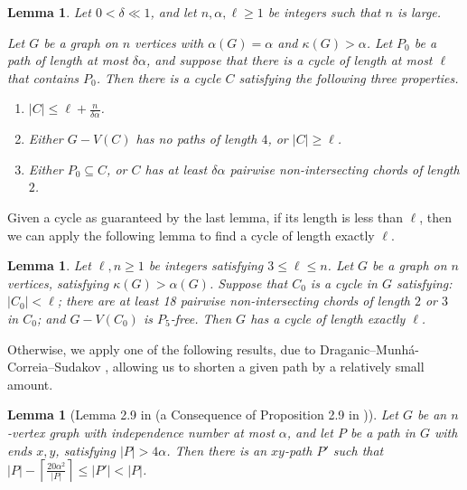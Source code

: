 \documentclass[11pt,english]{article}
\theoremstyle{plain}
\newtheorem{lemma}[theorem]{Lemma}
\theoremstyle{definition}
\theoremstyle{remark}
\newcommand{\ceil}[1]{
	\left\lceil #1 \right\rceil
}
\begin{document}
		\begin{lemma} \label{lem:long}
			Let $0 < \delta \ll 1$, and let $n, \alpha, \ell \ge 1$ be integers such that $n$ is large.

			Let $G$ be a graph on $n$ vertices with $\alpha(G) = \alpha$ and $\kappa(G) > \alpha$.
			Let $P_0$ be a path of length at most $\delta \alpha$, and suppose that there is a cycle of length at most $\ell$ that contains $P_0$.
			Then there is a cycle $C$ satisfying the following three properties.
			\begin{enumerate}[label = \rm(\arabic*)]
				\item \label{itm:long-jump}
					$|C| \le \ell + \frac{n}{\delta \alpha}$.
				\item \label{itm:long-length-4}
					Either $G - V(C)$ has no paths of length $4$, or $|C| \ge \ell$. 
				\item \label{itm:long-chords}
					Either $P_0 \subseteq C$, or $C$ has at least $\delta \alpha$ pairwise non-intersecting chords of length $2$.
			\end{enumerate}
		\end{lemma}
		 
		Given a cycle as guaranteed by the last lemma, if its length is less than $\ell$, then we can apply the following lemma to find a cycle of length exactly $\ell$.

		\begin{lemma} \label{lem:length-3-remainder}
			Let $\ell, n \ge 1$ be integers satisfying $3 \le \ell \le n$. %
			Let $G$ be a graph on $n$ vertices, satisfying $\kappa(G) > \alpha(G)$. Suppose that $C_0$ is a cycle in $G$ satisfying: $|C_0| < \ell$; there are at least 18 pairwise non-intersecting chords of length $2$ or $3$ in $C_0$; and $G - V(C_0)$ is $P_5$-free.
			Then $G$ has a cycle of length exactly $\ell$.
		\end{lemma}

		Otherwise, we apply one of the following results, due to Draganic--Munh\'a-Correia--Sudakov \cite{draganic2022pancyclicity,draganic2023chvatal}, allowing us to shorten a given path by a relatively small amount. 

		\begin{lemma}[Lemma 2.9 in \cite{draganic2023chvatal} (a Consequence of Proposition 2.9 in \cite{draganic2022pancyclicity})] \label{cor:shortening-indep}
			Let $G$ be an $n$-vertex graph with independence number at most $\alpha$, and let $P$ be a path in $G$ with ends $x,y$, satisfying $|P| > 4\alpha$.
			Then there is an $xy$-path $P'$ such that $|P| - \ceil{\frac{20\alpha^2}{|P|}} \le |P'| < |P|$.
		\end{lemma}
\end{document}
